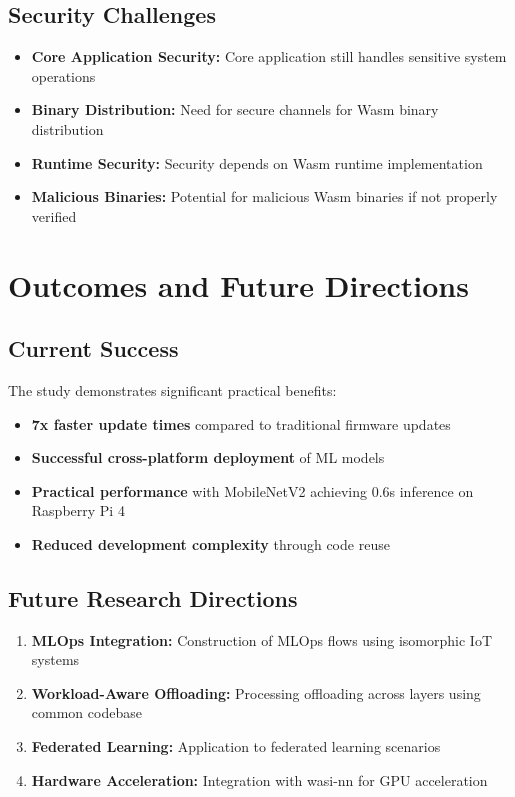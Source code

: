\documentclass[11pt]{article}
\begin{document}
\subsection{Security Challenges}

\begin{itemize}
\item \textbf{Core Application Security:} Core application still handles sensitive system operations
\item \textbf{Binary Distribution:} Need for secure channels for Wasm binary distribution
\item \textbf{Runtime Security:} Security depends on Wasm runtime implementation
\item \textbf{Malicious Binaries:} Potential for malicious Wasm binaries if not properly verified
\end{itemize}

\section{Outcomes and Future Directions}

\subsection{Current Success}

The study demonstrates significant practical benefits:

\begin{itemize}
\item \textbf{7x faster update times} compared to traditional firmware updates
\item \textbf{Successful cross-platform deployment} of ML models
\item \textbf{Practical performance} with MobileNetV2 achieving 0.6s inference on Raspberry Pi 4
\item \textbf{Reduced development complexity} through code reuse
\end{itemize}

\subsection{Future Research Directions}

\begin{enumerate}[label=\arabic*.]
\item \textbf{MLOps Integration:} Construction of MLOps flows using isomorphic IoT systems
\item \textbf{Workload-Aware Offloading:} Processing offloading across layers using common codebase
\item \textbf{Federated Learning:} Application to federated learning scenarios
\item \textbf{Hardware Acceleration:} Integration with wasi-nn for GPU acceleration
\end{enumerate}
\end{document}
